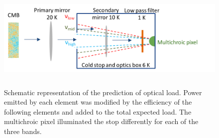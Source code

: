 \documentclass[]{spie}  %
\begin{document}
\begin{figure} [ht]
\begin{center}
\hspace{1cm} \includegraphics[height=5cm]{load_calc_MCP.png}
\end{center}
\caption[load] { \label{fig:load} 
Schematic representation of the prediction of optical load.  Power emitted by each element was modified by the efficiency of 
the following elements and added to the total expected load.  The multichroic pixel illuminated the stop differently for 
each of the three bands. }
\end{figure} 
\end{document}
